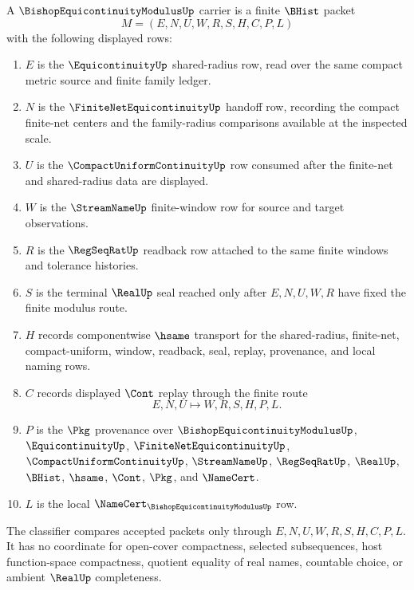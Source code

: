 \begin{definition}
\label{def:bishop-equicontinuity-modulus-carrier}
A $\BishopEquicontinuityModulusUp$ carrier is a finite $\BHist$ packet
$$
M=(E,N,U,W,R,S,H,C,P,L)
$$
with the following displayed rows:
\begin{enumerate}
\item $E$ is the $\EquicontinuityUp$ shared-radius row, read over the same compact metric source and finite family ledger.
\item $N$ is the $\FiniteNetEquicontinuityUp$ handoff row, recording the compact finite-net centers and the family-radius comparisons available at the inspected scale.
\item $U$ is the $\CompactUniformContinuityUp$ row consumed after the finite-net and shared-radius data are displayed.
\item $W$ is the $\StreamNameUp$ finite-window row for source and target observations.
\item $R$ is the $\RegSeqRatUp$ readback row attached to the same finite windows and tolerance histories.
\item $S$ is the terminal $\RealUp$ seal reached only after $E,N,U,W,R$ have fixed the finite modulus route.
\item $H$ records componentwise $\hsame$ transport for the shared-radius, finite-net, compact-uniform, window, readback, seal, replay, provenance, and local naming rows.
\item $C$ records displayed $\Cont$ replay through the finite route
$$
E,N,U \longmapsto W,R,S,H,P,L .
$$
\item $P$ is the $\Pkg$ provenance over $\BishopEquicontinuityModulusUp$, $\EquicontinuityUp$, $\FiniteNetEquicontinuityUp$, $\CompactUniformContinuityUp$, $\StreamNameUp$, $\RegSeqRatUp$, $\RealUp$, $\BHist$, $\hsame$, $\Cont$, $\Pkg$, and $\NameCert$.
\item $L$ is the local $\NameCert_{\BishopEquicontinuityModulusUp}$ row.
\end{enumerate}
The classifier compares accepted packets only through $E,N,U,W,R,S,H,C,P,L$. It has no coordinate for open-cover compactness, selected subsequences, host function-space compactness, quotient equality of real names, countable choice, or ambient $\RealUp$ completeness.
\end{definition}

